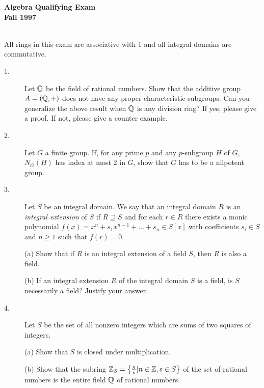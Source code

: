 \documentclass{article}
\begin{document}






\begin{center}\begin{LARGE}
{\bf Algebra Qualifying Exam}\\ 
{\bf Fall 1997}\\ \end{LARGE}
\end{center}
\vspace{0.1in}
\noindent\hrulefill\\
All rings in this exam are associative with 1 and all integral domains
are commutative.

\begin{description}

\item[1.]
Let $\Bbb Q$ be the field of rational numbers. Show that the additive group
$A=(\Bbb Q, +)$ does not have any proper characteristic subgroups. Can you
generalize the above result when $\Bbb Q$ is any division ring? If yes, please
give a proof. If not, please give a counter example.

\item[2.]
Let $G$ a finite group. If, for any prime $p$ and any $p$-subgroup
$H$ of $G$, $N_G(H)$ has index at most 2 in $G$, show that $G$ has to be
a nilpotent group.

\item[3.]
Let $S$ be an integral domain. We say that an integral domain $R$ is
an {\it integral extension} of $S$ if $R \supseteq S$ and for each
$r \in R$ there exists a monic polynomial
$f(x) = x^n +s_1x^{n-1} + \dots + s_n \in S[x]$
with coefficients $s_i \in S$ and $n \geq 1$ such that $f(r) = 0$.

\item[\quad] (a)
Show that if $R$ is an integral extension of a field $S$, then
$R$ is also a field.

\item[\quad] (b)
If an integral extension $R$ of the integral domain $S$ is a field, is $S$
necessarily a field? Justify your answer.

\item[4.]
Let $S$ be the set of all nonzero integers which are sums of two squares of
integers.

\item[\quad] (a)
Show that $S$ is closed under multiplication.

\item[\quad] (b)
Show that the subring
$\Bbb Z_S = \left\{\frac{n}{s} |n \in \Bbb Z, s \in S \right\}$
of the set of rational numbers is the entire field $\Bbb Q$ of rational
numbers.


\end{description}
\end{document}

